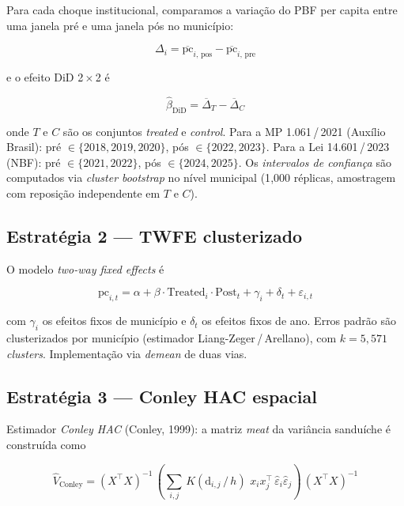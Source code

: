 \documentclass[12pt,a4paper,oneside]{article}
\begin{document}
Para cada choque institucional, comparamos a variação do PBF per
capita entre uma janela pré e uma janela pós no município:

\begin{equation}\label{eq:did2x2}
\Delta_i = \overline{\text{pc}}_{i,\,\text{pos}} -
           \overline{\text{pc}}_{i,\,\text{pre}}
\end{equation}

\noindent
e o efeito DiD 2\,$\times$\,2 é

\begin{equation}\label{eq:did}
\hat{\beta}_{\text{DiD}} =
   \overline{\Delta}_T -
   \overline{\Delta}_C
\end{equation}

\noindent
onde $T$ e $C$ são os conjuntos \textit{treated} e \textit{control}.
Para a MP 1.061\,/\,2021 (Auxílio Brasil): pré $\in \{2018, 2019,
2020\}$, pós $\in \{2022, 2023\}$. Para a Lei 14.601\,/\,2023 (NBF):
pré $\in \{2021, 2022\}$, pós $\in \{2024, 2025\}$. Os \textit{intervalos
de confiança} são computados via \textit{cluster bootstrap} no nível
municipal (1{,}000 réplicas, amostragem com reposição independente
em $T$ e $C$).

\subsection{Estratégia 2 — TWFE clusterizado}

O modelo \textit{two-way fixed effects} é

\begin{equation}\label{eq:twfe}
\text{pc}_{i, t} =
   \alpha + \beta \cdot \text{Treated}_i \cdot \text{Post}_t +
   \gamma_i + \delta_t + \varepsilon_{i, t}
\end{equation}

\noindent
com $\gamma_i$ os efeitos fixos de município e $\delta_t$ os efeitos
fixos de ano. Erros padrão são clusterizados por município
(estimador Liang-Zeger\,/\,Arellano), com $k = 5{,}571$
\textit{clusters}. Implementação via \textit{demean} de duas vias.

\subsection{Estratégia 3 — Conley HAC espacial}

Estimador \textit{Conley HAC} (Conley, 1999): a matriz \textit{meat}
da variância sanduíche é construída como

\begin{equation}\label{eq:conley}
\widehat{V}_{\text{Conley}} =
   (X^\top X)^{-1}\,
   \left(\sum_{i, j}\,
        K(\text{d}_{i, j}\,/\,h)\,\,
        x_i x_j^\top\,
        \hat{\varepsilon}_i \hat{\varepsilon}_j\right)\,
   (X^\top X)^{-1}
\end{equation}
\end{document}
